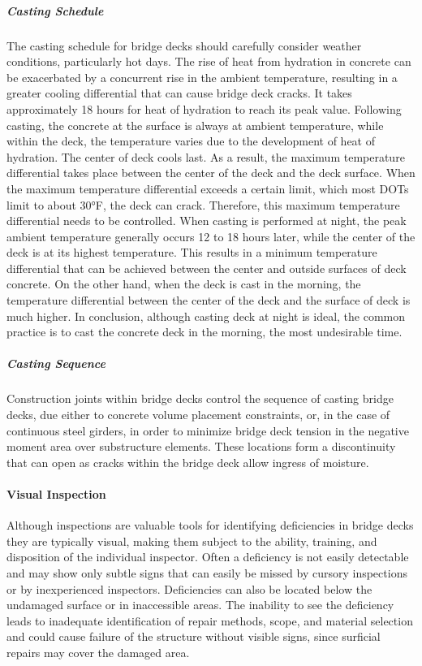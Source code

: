 \subparagraph{Casting Schedule}
The casting schedule for bridge decks should carefully consider weather conditions, particularly hot days. The rise of heat from hydration in concrete can be exacerbated by a concurrent rise in the ambient temperature, resulting in a greater cooling differential that can cause bridge deck cracks. It takes approximately 18 hours for heat of hydration to reach its peak value. Following casting, the concrete at the surface is always at ambient temperature, while within the deck, the temperature varies due to the development of heat of hydration. The center of deck cools last. As a result, the maximum temperature differential takes place between the center of the deck and the deck surface. When the maximum temperature differential exceeds a certain limit, which most DOTs limit to about 30°F, the deck can crack. Therefore, this maximum temperature differential needs to be controlled. When casting is performed at night, the peak ambient temperature generally occurs 12 to 18 hours later, while the center of the deck is at its highest temperature. This results in a minimum temperature differential that can be achieved between the center and outside surfaces of deck concrete. On the other hand, when the deck is cast in the morning, the temperature differential between the center of the deck and the surface of deck is much higher. In conclusion, although casting deck at night is ideal, the common practice is to cast the concrete deck in the morning, the most undesirable time.

\subparagraph{Casting Sequence}
Construction joints within bridge decks control the sequence of casting bridge decks, due either to concrete volume placement constraints, or, in the case of continuous steel girders, in order to minimize bridge deck tension in the negative moment area over substructure elements. These locations form a discontinuity that can open as cracks within the bridge deck allow ingress of moisture.


\paragraph{Visual Inspection}
Although inspections are valuable tools for identifying deficiencies in bridge decks they are typically visual, making them subject to the ability, training, and disposition of the individual inspector. Often a deficiency is not easily detectable and may show only subtle signs that can easily be missed by cursory inspections or by inexperienced inspectors. Deficiencies can also be located below the undamaged surface or in inaccessible areas. The inability to see the deficiency leads to inadequate identification of repair methods, scope, and material selection and could cause failure of the structure without visible signs, since surficial repairs may cover the damaged area.


